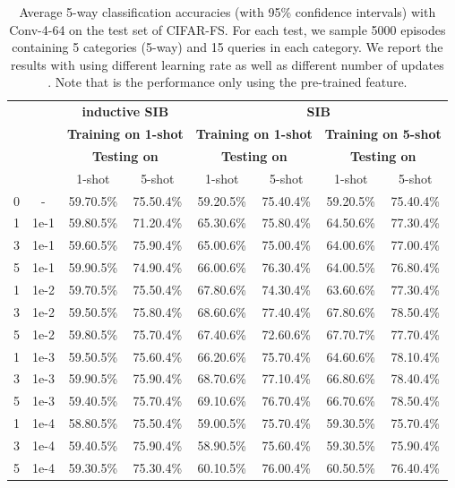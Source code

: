 \documentclass{article} \usepackage{iclr2020_conference,times}
\begin{document}
\label{sec:cifar}
\begin{table}[ht]
\centering
\footnotesize
\begin{tabular}{ c c | c c | c c | c c}
\toprule
 & & \multicolumn{2}{c|}{\textbf{inductive SIB}} & \multicolumn{4}{c}{\textbf{SIB}} \\
 & & \multicolumn{2}{c|}{\textbf{Training on 1-shot}} & \multicolumn{2}{c|}{\textbf{Training on 1-shot}} & \multicolumn{2}{c}{\textbf{Training on 5-shot}} \\
 & & \multicolumn{2}{c|}{\textbf{Testing on}} & \multicolumn{2}{c|}{\textbf{Testing on}} & \multicolumn{2}{c}{\textbf{Testing on}} \\
   &  & 1-shot & 5-shot & 1-shot & 5-shot & 1-shot & 5-shot \\
\midrule
0 & - & 59.70.5\% & 75.50.4\% & 59.20.5\% & 75.40.4\% & 59.20.5\% & 75.40.4\% \\\hdashline

1 & 1e-1 & 59.80.5\% & 71.20.4\% & 65.30.6\% & 75.80.4\% & 64.50.6\% & 77.30.4\% \\
3 & 1e-1 & 59.60.5\% & 75.90.4\% & 65.00.6\% & 75.00.4\% & 64.00.6\% & 77.00.4\% \\
5 & 1e-1 & 59.90.5\% & 74.90.4\% & 66.00.6\% & 76.30.4\% & 64.00.5\% & 76.80.4\% \\\hdashline

1 & 1e-2 & 59.70.5\% & 75.50.4\% & 67.80.6\% & 74.30.4\% &  63.60.6\%& 77.30.4\% \\
3 & 1e-2 & 59.50.5\% & 75.80.4\% & 68.60.6\% & 77.40.4\% & 67.80.6\% & 78.50.4\% \\
5 & 1e-2 & 59.80.5\% & 75.70.4\% & 67.40.6\% & 72.60.6\% & 67.70.7\% & 77.70.4\% \\\hdashline

1 & 1e-3 & 59.50.5\% & 75.60.4\% & 66.20.6\% & 75.70.4\% & 64.60.6\% & 78.10.4\% \\
3 & 1e-3 & 59.90.5\% & 75.90.4\% & 68.70.6\% & 77.10.4\% & 66.80.6\% & 78.40.4\% \\
5 & 1e-3 & 59.40.5\% & 75.70.4\% & 69.10.6\% & 76.70.4\% & 66.70.6\% & 78.50.4\% \\\hdashline

1 & 1e-4 & 58.80.5\% & 75.50.4\% & 59.00.5\% & 75.70.4\% & 59.30.5\% & 75.70.4\% \\
3 & 1e-4 & 59.40.5\% & 75.90.4\% & 58.90.5\% & 75.60.4\% & 59.30.5\% & 75.90.4\% \\
5 & 1e-4 & 59.30.5\% & 75.30.4\% & 60.10.5\% & 76.00.4\% & 60.50.5\% & 76.40.4\% \\
\bottomrule
\end{tabular}
\caption{Average 5-way classification accuracies (with 95\% confidence intervals) with Conv-4-64 on the test set of CIFAR-FS. For each test, we sample 5000 episodes containing 5 categories (5-way) and 15 queries in each category. We report the results with using different learning rate  as well as  different number of updates . Note that  is the performance only using the pre-trained feature. }
\label{tab:tab-2}
\end{table}
\end{document}

